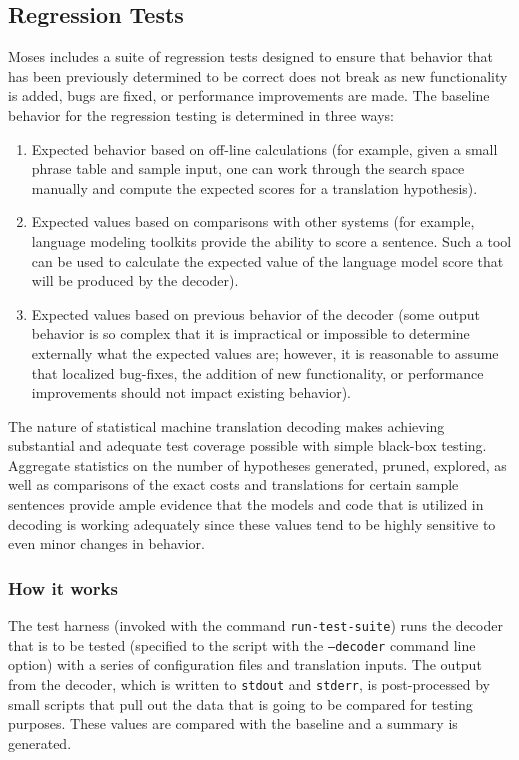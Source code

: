 \documentclass[10pt]{report}
\theoremstyle{plain}
\begin{document}
{\subsection{Regression Tests}
Moses includes a suite of regression tests designed to ensure that
behavior that has been previously determined to be correct does not
break as new functionality is added, bugs are fixed, or performance
improvements are made. The baseline behavior for the regression
testing is determined in three ways:
\begin{enumerate}
  \item Expected behavior based on off-line calculations (for example,
  given a small phrase table and sample input, one can work through
  the search space manually and compute the expected scores for a translation hypothesis).
  \item Expected values based on comparisons with other systems (for
  example, language modeling toolkits provide the ability to score
  a sentence.  Such a tool can be used to calculate the expected value of
  the language model score that will be produced by the decoder).
  \item Expected values based on previous behavior of the decoder (some output behavior
  is so complex that it is impractical or impossible to determine externally
  what the expected values are; however, it is reasonable to assume that localized bug-fixes,
  the addition of new functionality, or performance improvements should not impact existing
  behavior).
\end{enumerate}
The nature of statistical machine translation decoding makes
achieving substantial and adequate test coverage possible with
simple black-box testing.  Aggregate statistics on the number of
hypotheses generated, pruned, explored, as well as comparisons of
the exact costs and translations for certain sample sentences
provide ample evidence that the models and code that is utilized in
decoding is working adequately since these values tend to be highly
sensitive to even minor changes in behavior.

\subsubsection{How it works}
The test harness (invoked with the command \texttt{run-test-suite})
runs the decoder that is to be tested (specified to the script with
the \texttt{--decoder} command line option) with a series of
configuration files and translation inputs.  The output from the
decoder, which is written to \texttt{stdout} and \texttt{stderr}, is
post-processed by small scripts that pull out the data that is going
to be compared for testing purposes.  These values are compared with
the baseline and a summary is generated.

}
\end{document}
